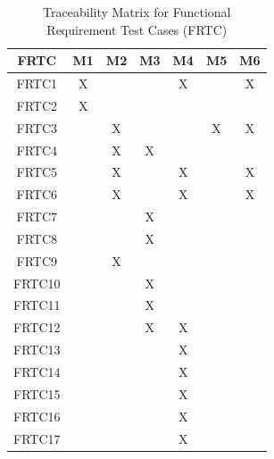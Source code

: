 \documentclass[12pt, titlepage]{article}
\begin{document}
\begin{table}[h!]
  \centering
  \caption{Traceability Matrix for Functional Requirement Test Cases (FRTC)}
  \begin{tabular}{|c|c|c|c|c|c|c|}
    \hline
    \textbf{FRTC} & \textbf{M1} & \textbf{M2} & \textbf{M3} & \textbf{M4} & \textbf{M5} & \textbf{M6} \\
    \hline
    FRTC1 & X &   &   & X &   & X \\
    \hline
    FRTC2 & X &   &   &   &   &   \\
    \hline
    FRTC3 &   & X &   &   & X & X \\
    \hline
    FRTC4 &   & X & X &   &   &   \\
    \hline
    FRTC5 &   & X &   & X &   & X \\
    \hline
    FRTC6 &   & X &   & X &   & X \\
    \hline
    FRTC7 &   &   & X &   &   &   \\
    \hline
    FRTC8 &   &   & X &   &   &   \\
    \hline
    FRTC9 &   & X &   &   &   &   \\
    \hline
    FRTC10 &   &   & X &   &   &   \\
    \hline
    FRTC11 &   &   & X &   &   &   \\
    \hline
    FRTC12 &   &   & X & X &   &   \\
    \hline
    FRTC13 &   &   &   & X &   &   \\
    \hline
    FRTC14 &   &   &   & X &   &   \\
    \hline
    FRTC15 &   &   &   & X &   &   \\
    \hline
    FRTC16 &   &   &   & X &   &   \\
    \hline
    FRTC17 &   &   &   & X &   &   \\
    \hline
  \end{tabular}
\end{table}
\end{document}
